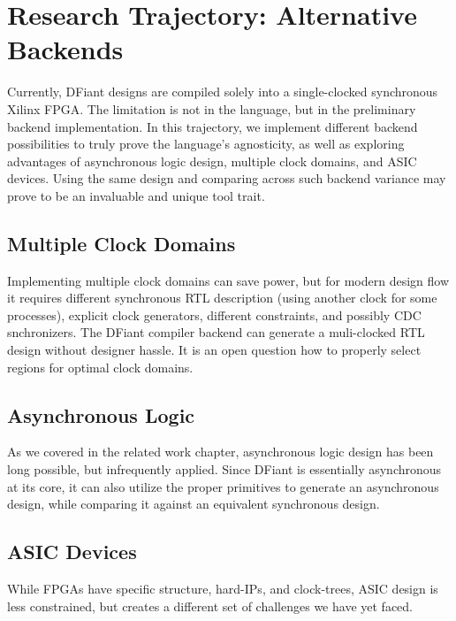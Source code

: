 \chapter{Research Trajectory: Alternative Backends}
\label{chap:trajectory_backend}
Currently, DFiant designs are compiled solely into a single-clocked synchronous Xilinx FPGA. The limitation is not in the language, but in the preliminary backend implementation. In this trajectory, we implement different backend possibilities to truly prove the language's agnosticity, as well as exploring advantages of asynchronous logic design, multiple clock domains, and ASIC devices. Using the same design and comparing across such backend variance may prove to be an invaluable and unique tool trait.

\section{Multiple Clock Domains}
\label{sec:multiple_clock_domains}
Implementing multiple clock domains can save power, but for modern design flow it requires different synchronous RTL description (using another clock for some processes), explicit clock generators, different constraints, and possibly CDC snchronizers. The DFiant compiler backend can generate a muli-clocked RTL design without designer hassle. It is an open question how to properly select regions for optimal clock domains.

\section{Asynchronous Logic}
As we covered in the related work chapter, asynchronous logic design has been long possible, but infrequently applied. Since DFiant is essentially asynchronous at its core, it can also utilize the proper primitives to generate an asynchronous design, while comparing it against an equivalent synchronous design.

\section{ASIC Devices}
While FPGAs have specific structure, hard-IPs, and clock-trees, ASIC design is less constrained, but creates a different set of challenges we have yet faced.
